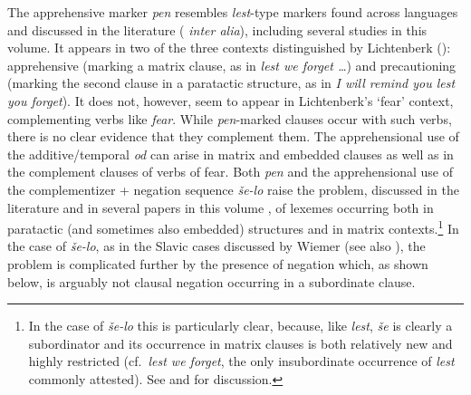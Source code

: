 \documentclass[output=paper,colorlinks,citecolor=brown]{langscibook}
\begin{document}
\largerpage
The apprehensive marker \textit{pen} resembles \textit{lest}-type markers found across languages and discussed in the literature (\citealt{lichtenberk95, angelo-berndt16, puskas17} \textit{inter alia}), including several studies in this volume. It appears in two of the three contexts distinguished by Lichtenberk (\citeyear{lichtenberk95}): apprehensive (marking a matrix clause, as in \textit{lest we forget {\ldots}}) and precautioning (marking the second clause in a paratactic structure, as in \textit{I will remind you lest you forget}). It does not, however, seem to appear in  Lichtenberk's `fear' context, complementing verbs like \textit{fear}. While \textit{pen}-marked clauses occur with such verbs, there is no clear evidence that they complement them. The apprehensional use of the additive/temporal \textit{od} can arise in matrix and embedded clauses as well as in the complement clauses of verbs of fear. Both \textit{pen} and the apprehensional use of the complementizer + negation sequence \textit{še-lo} raise the problem, discussed in the literature and in several papers in this volume \citep{chapters/introduction, chapters/wiemer}, of lexemes occurring both in paratactic (and sometimes also embedded) structures and in matrix contexts.\footnote{In the case of \textit{še-lo} this is particularly clear, because, like \textit{lest}, \textit{še} is clearly a subordinator and its occurrence in matrix clauses is both relatively new and highly restricted (cf.\  \textit{lest we forget}, the only insubordinate occurrence of \textit{lest} commonly attested). See \citet{schwarzwald-shlomo} and \citet{francez-JJL} for discussion.} In the case of \textit{še-lo}, as in the Slavic cases discussed by Wiemer (see also \citealt{baydina}), the problem is complicated further by the presence of negation which, as shown below, is arguably not clausal negation occurring in a subordinate clause.
\end{document}
